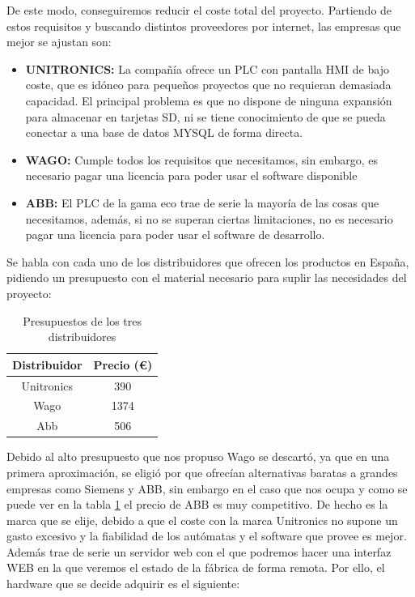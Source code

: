 De este modo, conseguiremos reducir el coste total del proyecto. Partiendo de estos requisitos y buscando distintos proveedores por internet, las empresas que mejor se ajustan son:

\begin{itemize}
		\item{\textbf{UNITRONICS:} La compañía ofrece un PLC con pantalla HMI de bajo coste, que es idóneo para pequeños proyectos que no requieran demasiada capacidad. El principal problema es que no dispone de ninguna expansión para almacenar en tarjetas SD, ni se tiene conocimiento de que se pueda conectar a una base de datos MYSQL de forma directa.}
		\item{\textbf{WAGO:} Cumple todos los requisitos que necesitamos, sin embargo, es necesario pagar una licencia para poder usar el software disponible}
		\item{\textbf{ABB:} El PLC de la gama eco trae de serie la mayoría de las cosas que necesitamos, además, si no se superan ciertas limitaciones, no es necesario pagar una licencia para poder usar el software de desarrollo.}
\end{itemize}

Se habla con cada uno de los distribuidores que ofrecen los productos en España, pidiendo un presupuesto con el material necesario para suplir las necesidades del proyecto:

\begin{table}[H]
\centering
\begin{tabular}{cc}
{\bf Distribuidor} & {\bf Precio (\euro{})} \\ \hline
Unitronics         & 390              \\
Wago               & 1374             \\
Abb                & 506              \\ \hline
\end{tabular}
\caption{Presupuestos de los tres distribuidores}
\label{tab:presupuestos}
\end{table}


Debido al alto presupuesto que nos propuso Wago se descartó, ya que en una primera aproximación, se eligió por que ofrecían alternativas baratas a grandes empresas como Siemens y ABB, sin embargo en el caso que nos ocupa y como se puede ver en la tabla \ref{tab:presupuestos} el precio de ABB es muy competitivo. De hecho es la marca que se elije, debido a que el coste con la marca Unitronics no supone un gasto excesivo y la fiabilidad de los autómatas y el software que provee es mejor. Además trae de serie un servidor web con el que podremos hacer una interfaz WEB en la que veremos el estado de la fábrica de forma remota. Por ello, el hardware que se decide adquirir es el siguiente:

